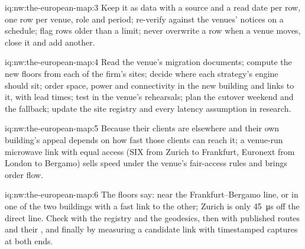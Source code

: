 \begin{solution}{iq:nw:the-european-map:3}
Keep it as data with a source and a read date per row, one row per venue, role and period; re-verify against the venues' notices on a
schedule; flag rows older than a limit; never overwrite a row when a venue moves, close it and add another.
\end{solution}

\begin{solution}{iq:nw:the-european-map:4}
Read the venue's migration documents; compute the new floors from each of the firm's sites; decide where each strategy's engine should sit;
order space, power and connectivity in the new building and links to it, with lead times; test in the venue's rehearsals; plan the cutover
weekend and the fallback; update the site registry and every latency assumption in research.
\end{solution}

\begin{solution}{iq:nw:the-european-map:5}
Because their clients are elsewhere and their own building's appeal depends on how fast those clients can reach it; a venue-run microwave
link with equal access (SIX from Zurich to Frankfurt, Euronext from London to Bergamo) sells speed under the venue's fair-access rules and
brings order flow.
\end{solution}

\begin{solution}{iq:nw:the-european-map:6}
The floors say: near the Frankfurt--Bergamo line, or in one of the two buildings with a fast link to the other; Zurich is only
\qty{45}{\micro\second} off the direct line. Check with the registry and the geodesics, then with published routes and their ,
and finally by measuring a candidate link with timestamped captures at both ends.
\end{solution}
